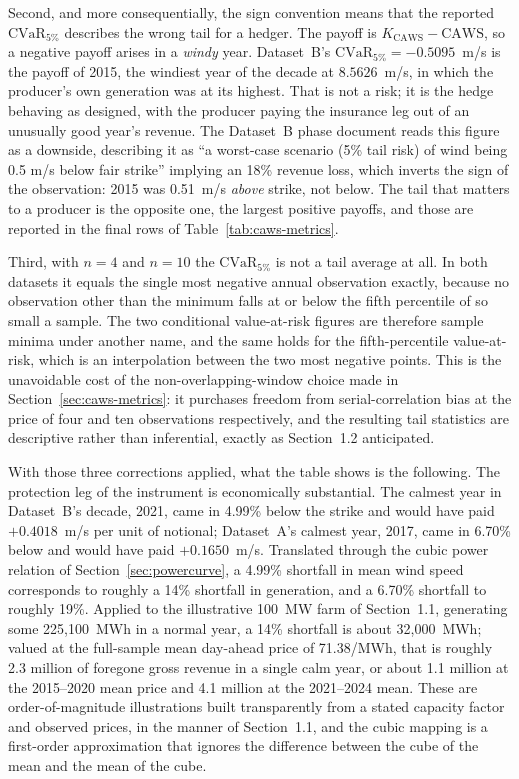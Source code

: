 \documentclass[11pt, a4paper, twoside]{article}
\begin{document}
Second, and more consequentially, the sign convention means that the reported $\mathrm{CVaR}_{5\%}$ describes the wrong tail for a hedger. The payoff is $K_{\mathrm{CAWS}} - \mathrm{CAWS}$, so a negative payoff arises in a \emph{windy} year. Dataset~B's $\mathrm{CVaR}_{5\%} = -0.5095$~m/s is the payoff of 2015, the windiest year of the decade at $8.5626$~m/s, in which the producer's own generation was at its highest. That is not a risk; it is the hedge behaving as designed, with the producer paying the insurance leg out of an unusually good year's revenue. The Dataset~B phase document reads this figure as a downside, describing it as ``a worst-case scenario (5\% tail risk) of wind being 0.5 m/s below fair strike'' implying an 18\% revenue loss, which inverts the sign of the observation: 2015 was 0.51~m/s \emph{above} strike, not below. The tail that matters to a producer is the opposite one, the largest positive payoffs, and those are reported in the final rows of Table~\ref{tab:caws-metrics}.

Third, with $n = 4$ and $n = 10$ the $\mathrm{CVaR}_{5\%}$ is not a tail average at all. In both datasets it equals the single most negative annual observation exactly, because no observation other than the minimum falls at or below the fifth percentile of so small a sample. The two conditional value-at-risk figures are therefore sample minima under another name, and the same holds for the fifth-percentile value-at-risk, which is an interpolation between the two most negative points. This is the unavoidable cost of the non-overlapping-window choice made in Section~\ref{sec:caws-metrics}: it purchases freedom from serial-correlation bias at the price of four and ten observations respectively, and the resulting tail statistics are descriptive rather than inferential, exactly as Section~1.2 anticipated.

With those three corrections applied, what the table shows is the following. The protection leg of the instrument is economically substantial. The calmest year in Dataset~B's decade, 2021, came in 4.99\% below the strike and would have paid $+0.4018$~m/s per unit of notional; Dataset~A's calmest year, 2017, came in 6.70\% below and would have paid $+0.1650$~m/s. Translated through the cubic power relation of Section~\ref{sec:powercurve}, a 4.99\% shortfall in mean wind speed corresponds to roughly a 14\% shortfall in generation, and a 6.70\% shortfall to roughly 19\%. Applied to the illustrative 100~MW farm of Section~1.1, generating some 225{,}100~MWh in a normal year, a 14\% shortfall is about 32{,}000~MWh; valued at the full-sample mean day-ahead price of \texteuro{}71.38/MWh, that is roughly \texteuro{}2.3 million of foregone gross revenue in a single calm year, or about \texteuro{}1.1 million at the 2015--2020 mean price and \texteuro{}4.1 million at the 2021--2024 mean. These are order-of-magnitude illustrations built transparently from a stated capacity factor and observed prices, in the manner of Section~1.1, and the cubic mapping is a first-order approximation that ignores the difference between the cube of the mean and the mean of the cube.
\end{document}
